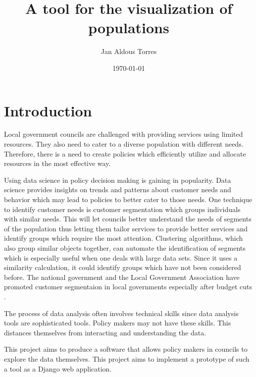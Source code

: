\documentclass[11pt]{informatics-report}
\title{A tool for the visualization of populations}
\author{Jan Aldous Torres}
\date{\today}
\begin{document}
\createFrontMatter
\onehalfspacing
\tableofcontents
\listoffigures
\doublespacing


\chapter{Introduction}

Local government councils are challenged with providing services using limited resources. They also need to cater to a diverse population with different needs. Therefore, there is a need to create policies which efficiently utilize and allocate resources in the most effective way. \par

Using data science in policy decision making is gaining in popularity. Data science provides insights on trends and patterns about customer needs and behavior which may lead to policies to better cater to those needs. One technique to identify customer needs is customer segmentation which groups individuals with similar needs. This will let councils better understand the needs of segments of the population thus letting them tailor services to provide better services and identify groups which require the most attention. Clustering algorithms, which also group similar objects together, can automate the identification of segments which is especially useful when one deals with large data sets. Since it uses a similarity calculation, it could identify groups which have not been considered before. The national government and the Local Government Association have promoted customer segmentaion in local governments especially after budget cuts \cite{smartcities} \cite{lgaguide}. \par

The process of data analysis often involves technical skills since data analysis tools are sophisticated tools. Policy makers may not have these skills. This distances themselves from interacting and understanding the data.\par

This project aims to produce a software that allows policy makers in councils to explore the data themselves. This project aims to implement a prototype of such a tool as a Django web application.\par
\end{document}
